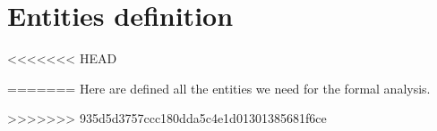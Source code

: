 \section{Entities definition}
<<<<<<< HEAD

=======
Here are defined all the entities we need for the formal analysis.

>>>>>>> 935d5d3757ccc180dda5c4e1d01301385681f6ce
